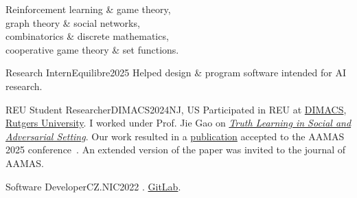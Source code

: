 \begin{multicols}{2}
\raggedcolumns


Reinforcement learning \& game theory, \\
graph theory \& social networks, \\
combinatorics \& discrete mathematics, \\
cooperative game theory \& set functions.



\begin{work}{Research Intern}{Equilibre}{2025}{\Praha{}}
	{Helped design \& program software intended for AI research.}
\end{work}

\worksplit

\begin{work}{REU Student Researcher}{DIMACS}{2024}{NJ, US}
	{Participated in REU at} \href{http://dmac.rutgers.edu/}{DIMACS}, \href{https://www.rutgers.edu/}{Rutgers University}.
	{I worked under Prof. Jie Gao on} \emph{\href{https://reu.dimacs.rutgers.edu/~fu37/}{Truth Learning in Social and Adversarial Setting}}.
	{Our work resulted in a \href{https://furadnik.github.io/projects/2025_truth_learning}{publication} accepted to the AAMAS 2025 conference}~\cite{aamas25}.
	{An extended version of the paper was invited to the journal of AAMAS.}
\end{work}

\worksplit

\begin{work}{Software Developer}{CZ.NIC}{2022}{\Praha{}}
	.
	 \href{https://gitlab.nic.cz/fred/eppic}{GitLab}.
\end{work}

\columnbreak



\end{multicols}
